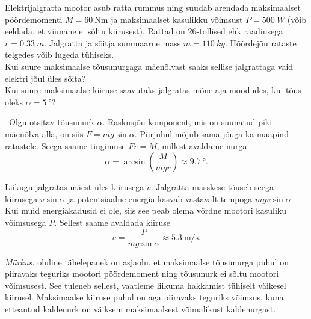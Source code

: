 
Elektrijalgratta mootor asub ratta rummus ning suudab arendada maksimaalset pöördemomenti $M=\SI{60}{\newton\meter}$ ja maksimaalset kasulikku võimsust $P=\SI{500}{W}$ (võib eeldada, et viimane ei sõltu kiirusest). Rattad on 26-tollised ehk raadiusega $r=\SI{0.33}{m}$. Jalgratta ja sõitja summaarne mass $m=\SI{110}{kg}$. Hõõrdejõu rataste telgedes võib lugeda tühiseks. \\
\osa Kui suure maksimaalse tõusunurgaga mäenõlvast saaks sellise jalgrattaga vaid elektri jõul üles sõita? \\
\osa Kui suure maksimaalse kiiruse saavutaks jalgratas mõne aja möödudes, kui tõus oleks $\alpha=\SI{5}{\degree}$? 

\hint

\solu
\
\osa Olgu otsitav tõusunurk $\alpha$. Raskusjõu komponent, mis on suunatud piki mäenõlva alla, on siis $F=mg\sin\alpha$. Piirjuhul mõjub sama jõuga ka maapind ratastele. Seega saame tingimuse $Fr=M$, millest avaldame nurga
\[
\alpha=\arcsin\left( \frac{M}{mgr}\right)\approx \SI{9.7}{\degree}.
\]

\osa Liikugu jalgratas mäest üles kiirusega $v$. Jalgratta masskese tõuseb seega kiirusega $v\sin\alpha$ ja potentsiaalne energia kasvab vastavalt tempoga $mgv\sin\alpha$. Kui muid energiakadusid ei ole, siis see peab olema võrdne mootori kasuliku võimsusega $P$. Sellest saame avaldada kiiruse
\[
v=\frac{P}{mg\sin\alpha}\approx \SI{5.3}{\meter\per\second}.
\]

\textit{Märkus:} oluline tähelepanek on asjaolu, et maksimaalse tõusunurga puhul on piiravaks teguriks mootori pöördemoment ning tõusunurk ei sõltu mootori võimsusest. See tuleneb sellest, vaatleme liikuma hakkamist tühiselt väikesel kiirusel. Maksimaalse kiiruse puhul on aga piiravaks teguriks võimsus, kuna etteantud kaldenurk on väiksem maksimaalsest võimalikust kaldenurgast.
\probend